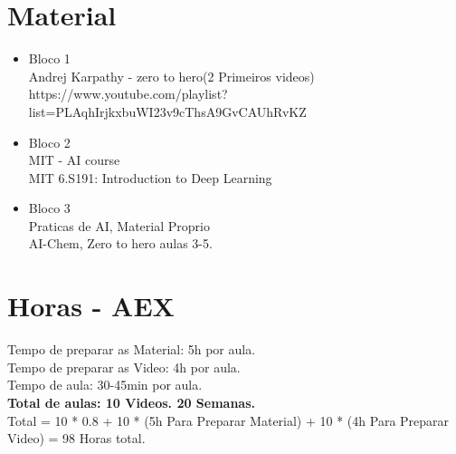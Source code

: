 \documentclass[a4paper,12pt, brazil]{article}
\begin{document}
    \section*{Material}
    \begin{itemize}
        \item Bloco 1 \\ Andrej Karpathy - zero to hero(2 Primeiros videos)\cite{karpathy}\\ https://www.youtube.com/playlist?list=PLAqhIrjkxbuWI23v9cThsA9GvCAUhRvKZ
        
        \item Bloco 2 \\ MIT - AI course\cite{mit_ai} \\ MIT 6.S191: Introduction to Deep Learning\cite{mit_deep_learning}
        
        \item Bloco 3 \\ Praticas de AI, Material Proprio \\ AI-Chem, Zero to hero aulas 3-5.
    
    \end{itemize}    
    
    \section*{Horas - AEX}
    
    Tempo de preparar as Material: 5h por aula.\\
    Tempo de preparar as Video: 4h por aula.\\
    Tempo de aula: 30-45min por aula.\\
    \textbf{Total de aulas: 10 Videos. 20 Semanas.}\\
    Total = 10 * 0.8 + 10 * (5h Para Preparar Material) + 10 * (4h Para Preparar Video) = 98 Horas total.
    
    \printbibliography
\end{document}
